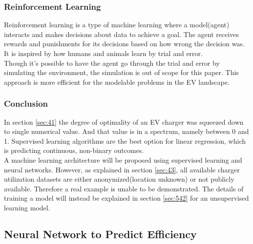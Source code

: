 \subsubsection{Reinforcement Learning}
Reinforcement learning is a type of machine learning where a model(agent) interacts and makes decisions about data to achieve a goal. The agent receives rewards and punishments for its decisions based on how wrong the decision was. It is inspired by how humans and animals learn by trial and error.\\
Though it's possible to have the agent go through the trial and error by simulating the environment, the simulation is out of scope for this paper. This approach is more efficient for the modelable problems in the EV landscape. 
\subsubsection{Conclusion}
In section \ref{sec:41} the degree of optimality of an EV charger was squeezed down to single numerical value. And that value is in a spectrum, namely between 0 and 1. Supervised learning algorithms are the best option for linear regression, which is predicting continuous, non-binary outcomes.\\
A machine learning architecture will be proposed using supervised learning and neural networks. However, as explained in section \ref{sec:43}, all available charger utilization datasets are either anonymized(location unknown) or not publicly available. Therefore a real example is unable to be demonstrated. The details of training a model will instead be explained in section \ref{sec:542} for an unsupervised learning model.


\subsection{Neural Network to Predict Efficiency}\label{sec:52}

